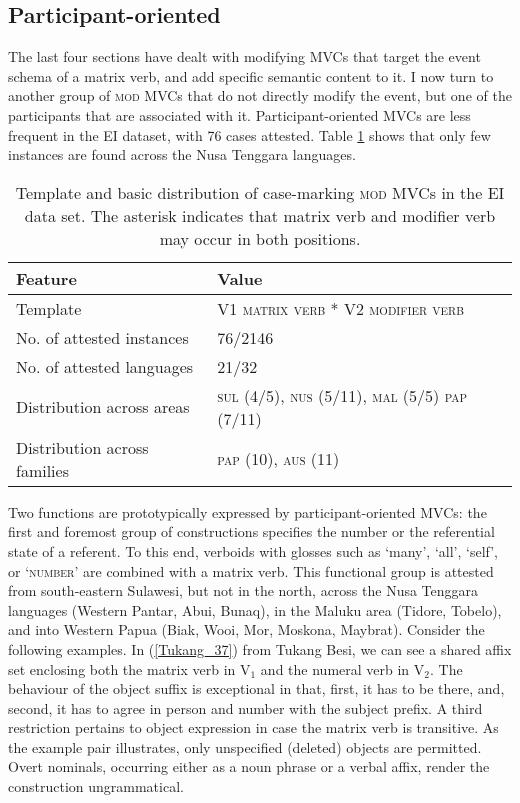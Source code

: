 \subsection{Participant-oriented}

The last four sections have dealt with modifying MVCs that target the event schema of a matrix verb, and add specific semantic content to it. I now turn to another group of \textsc{mod} MVCs that do not directly modify the event, but one of the participants that are associated with it. Participant-oriented MVCs are less frequent in the EI dataset, with 76 cases attested. Table \ref{table:participant} shows that only few instances are found across the Nusa Tenggara languages.

\begin{table}


\begin{tabular}{ll}
\lsptoprule
Feature&Value\tabularnewline
\hline
Template&V1 \textsc{matrix verb} * V2 \textsc{modifier verb}\tabularnewline
No. of attested instances& 76/2146 \tabularnewline
No. of attested languages& 21/32 \tabularnewline
Distribution across areas& \textsc{sul} (4/5), \textsc{nus} (5/11), \textsc{mal} (5/5) \textsc{pap} (7/11) \tabularnewline
Distribution across families& \textsc{pap} (10), \textsc{aus} (11) \tabularnewline
\hline
\end{tabular}
\caption[Template and basic distribution of case-marking \textsc{mod} MVCs]{Template and basic distribution of case-marking \textsc{mod} MVCs in the EI data set. The asterisk indicates that matrix verb and modifier verb may occur in both positions.}
\label{table:participant}
\end{table}


Two functions are prototypically expressed by participant-oriented MVCs: the first and foremost group of constructions specifies the number or the referential state of a referent. To this end, verboids with glosses such as `many', `all', `self', or `\textsc{number}' are combined with a matrix verb. This functional group is attested from south-eastern Sulawesi, but not in the north, across the Nusa Tenggara languages (Western Pantar, Abui, Bunaq), in the Maluku area (Tidore, Tobelo), and into Western Papua (Biak, Wooi, Mor, Moskona, Maybrat). Consider the following examples. In (\ref{Tukang_37}) from Tukang Besi, we can see a shared affix set enclosing both the matrix verb in V$_1$ and the numeral verb in V$_2$. The behaviour of the object suffix is exceptional in that, first, it has to be there, and, second, it has to agree in person and number with the subject prefix. A third restriction pertains to object expression in case the matrix verb is transitive. As the example pair illustrates, only unspecified (deleted) objects are permitted. Overt nominals, occurring either as a noun phrase or a verbal affix, render the construction ungrammatical.


